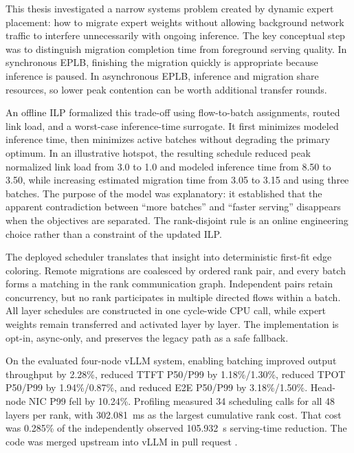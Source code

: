 \label{ch:conclusions}

This thesis investigated a narrow systems problem created by dynamic expert
placement: how to migrate expert weights without allowing background network
traffic to interfere unnecessarily with ongoing inference. The key conceptual
step was to distinguish migration completion time from foreground serving
quality. In synchronous EPLB, finishing the migration quickly is appropriate
because inference is paused. In asynchronous EPLB, inference and migration
share resources, so lower peak contention can be worth additional transfer
rounds.

An offline ILP formalized this trade-off using flow-to-batch assignments,
routed link load, and a worst-case inference-time surrogate. It first minimizes
modeled inference time, then minimizes active batches without degrading the
primary optimum. In an illustrative hotspot, the resulting schedule reduced
peak normalized link load from 3.0 to 1.0 and modeled inference time from
8.50 to 3.50, while increasing estimated migration time from 3.05 to 3.15 and
using three batches. The purpose of the model was explanatory: it established
that the apparent contradiction between ``more batches'' and ``faster
serving'' disappears when the objectives are separated. The rank-disjoint rule
is an online engineering choice rather than a constraint of the updated ILP.

The deployed scheduler translates that insight into deterministic first-fit
edge coloring. Remote migrations are coalesced by ordered rank pair, and every
batch forms a matching in the rank communication graph. Independent pairs
retain concurrency, but no rank participates in multiple directed flows within
a batch.
All layer schedules are constructed in one cycle-wide CPU call, while expert
weights remain transferred and activated layer by layer. The implementation is
opt-in, async-only, and preserves the legacy path as a safe fallback.

On the evaluated four-node vLLM system, enabling batching improved output
throughput by 2.28\%, reduced TTFT P50/P99 by 1.18\%/1.30\%, reduced TPOT
P50/P99 by 1.94\%/0.87\%, and reduced E2E P50/P99 by 3.18\%/1.50\%. Head-node
NIC P99 fell by 10.24\%. Profiling measured 34 scheduling calls for all 48
layers per rank, with \SI{302.081}{ms} as the largest cumulative rank cost.
That cost was 0.285\% of the independently observed \SI{105.932}{s} serving-time
reduction. The code was merged upstream into vLLM in pull request \prnumber.

